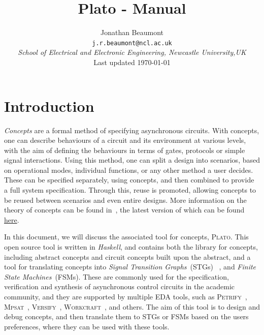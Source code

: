 \documentclass[british,technote,compsoc]{IEEEtran}
\newcommand{\noun}[1]{\textsc{#1}}
\begin{document}
\onecolumn
\title{Plato - Manual}
\author{Jonathan Beaumont\\
\texttt{j.r.beaumont@ncl.ac.uk}\\
\emph{School of Electrical and Electronic Engineering, Newcastle University,UK}\\
Last updated \today}

\maketitle

\tableofcontents

\newpage

\section{Introduction}

\emph{Concepts} are a formal method of specifying asynchronous circuits. With concepts, one can describe behaviours of a circuit and its environment at various levels, with the aim of
defining the behaviours in terms of gates, protocols or simple signal interactions. Using this method, one can split a design into scenarios, based on operational modes, individual functions, or 
any other method a user decides. These can be specified separately, using concepts, and then combined to provide a full system specification. Through this, reuse is promoted,
 allowing concepts to be reused between scenarios and even entire designs. More information on the theory of concepts can be found in~\cite{2016_beaumont_concepts}, the latest version 
of which can be found \href{https://github.com/tuura/concepts-article/releases}{here}.

In this document, we will discuss the associated tool for concepts, \noun{Plato}. This open source tool is written in \emph{Haskell}, and contains both the library for concepts, 
including abstract concepts and circuit concepts built upon the abstract, and a tool for translating concepts into \emph{Signal Transition Graphs}~(STGs)~\cite{Chu_1987_phd}
\cite{Rosenblum_1985_tpn}, and \emph{Finite State Machines}~(FSMs). These are commonly used for the specification, verification and synthesis of asynchronous control circuits in the academic community, and 
they are supported by multiple EDA tools, such as \noun{Petrify}~\cite{Cortadella}, \noun{Mpsat}~\cite{khomenko2004detecting}, \noun{Versify}~\cite{i1997formal}, 
\noun{Workcraft}~\cite{2007_poliakov_workcraft}\cite{Workcraft_website}, and others.  
The aim of this tool is to design and debug concepts, and then translate them to STGs or FSMs based on the users preferences, where they can be used with these tools. 
\end{document}
